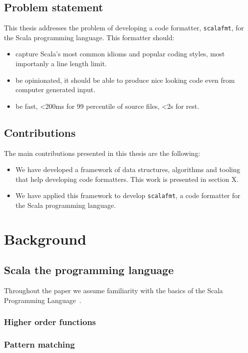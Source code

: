\documentclass[11pt,a4paper]{article}
\begin{document}
\subsection{Problem statement}
This thesis addresses the problem of developing a code formatter, \texttt{scalafmt}, for the Scala programming language.
This formatter should:
\begin{itemize}
  \item capture Scala's most common idioms and popular coding styles, most importanly a line length limit.
  \item be opinionated, it should be able to produce nice looking code even from computer generated input.
  \item be fast, <200ms for 99 percentile of source files, <2s for rest.
\end{itemize}

\subsection{Contributions}
The main contributions presented in this thesis are the following:
\begin{itemize}
    \item We have developed a framework of data structures, algorithms and tooling that help
      developing code formatters. This work is presented in section X.
    \item We have applied this framework to develop \texttt{scalafmt}, a code
      formatter for the Scala programming language.
\end{itemize}

\section{Background}
\subsection{Scala the programming language}

Throughout the paper we assume familiarity with the basics of the Scala
Programming Language~\autocite{odersky_scala_2004}.
\subsubsection{Higher order functions}
\subsubsection{Pattern matching}
\end{document}
